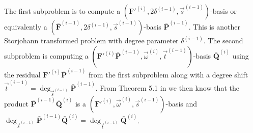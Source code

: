 The first subproblem is to compute a $(\mathbf{F}'^{\left(i\right)},2\delta^{\left(i-1\right)},\vec{s}^{\left(i-1\right)})$-basis
or equivalently a $(\bar{\mathbf{F}}^{\left(i-1\right)},2\delta^{\left(i-1\right)},\vec{s}^{\left(i-1\right)})$-basis
$\bar{\mathbf{P}}^{\left(i-1\right)}$. This is another Storjohann
transformed problem with degree parameter $\delta^{\left(i-1\right)}$.
The second subproblem is computing a $(\mathbf{F}'^{\left(i\right)}\bar{\mathbf{P}}^{\left(i-1\right)},\vec{\omega}^{\left(i\right)},\vec{t}^{\left(i-1\right)})$-basis
$\bar{\mathbf{Q}}^{\left(i\right)}$ using the residual $\mathbf{F}'^{\left(i\right)}\bar{\mathbf{P}}^{\left(i-1\right)}$
from the first subproblem along with a degree shift $\vec{t}^{\left(i-1\right)}=\deg_{\vec{s}^{\left(i-1\right)}}\bar{\mathbf{P}}^{\left(i-1\right)}$.
From Theorem 5.1 in \citep{BL1997} we then know that the product
$\bar{\mathbf{P}}^{\left(i-1\right)}\bar{\mathbf{Q}}^{\left(i\right)}$
is a $(\mathbf{F}'^{\left(i\right)},\vec{\omega}^{\left(i\right)},\vec{s}^{\left(i-1\right)})$-basis
and $\deg_{\vec{s}^{\left(i-1\right)}}\bar{\mathbf{P}}^{\left(i-1\right)}\bar{\mathbf{Q}}^{\left(i\right)}=\deg_{\vec{t}^{\left(i-1\right)}}\bar{\mathbf{Q}}^{\left(i\right)}$. 

